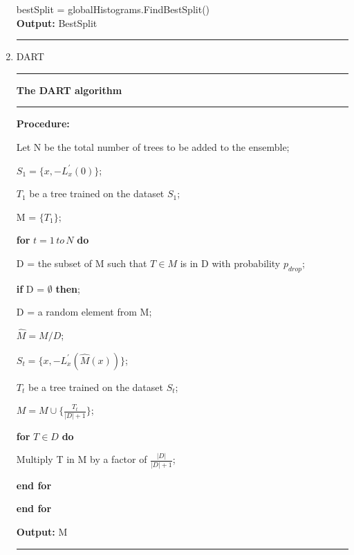 \documentclass[a4paper]{article}
\begin{document}
\begin{enumerate}
						\hspace*{32pt}	bestSplit = globalHistograms.FindBestSplit()\\
						\textbf{Output:} BestSplit\par
				\noindent\rule[0.10\baselineskip]{\textwidth}{0.75pt}\par
			\item DART\par
				\noindent\rule[0.10\baselineskip]{\textwidth}{0.5pt}\par
				\textbf{The DART algorithm}\\
				\noindent\rule[0.10\baselineskip]{\textwidth}{0.5pt}
						\textbf{Procedure:}\par
						\hspace*{32pt}	Let N be the total number of trees to be added to the ensemble;\par
						\hspace*{32pt}	$S_1 = \{x, -L_x^{'}(0)\}$;\par
						\hspace*{32pt}	$T_1$ be a tree trained on the dataset $S_1$;\par
						\hspace*{32pt}	M = $\{T_1\}$;\par
						\hspace*{32pt}  \textbf{for} $t = 1\,to\,N$ \textbf{do}\par
						\hspace*{48pt}	D = the subset of M such that $T\in M$ is in D with probability $p_{drop}$;\par
						\hspace*{48pt}  \textbf{if} D = $\emptyset$ \textbf{then};\par
						\hspace*{64pt}	D = a random element from M;\par
						\hspace*{48pt}	$\hat{M}  = M \slash D$;\par
						\hspace*{48pt}	$S_t = \{x, -L_x^{'}(\hat{M}(x))\}$;\par
						\hspace*{48pt}	$T_t$ be a tree trained on the dataset $S_t$;\par
						\hspace*{48pt}	$M = M \cup \{\frac{T_t}{|D|+1}\}$;\par
						\hspace*{48pt}	\textbf{for} $T\in D$ \textbf{do}\par
						\hspace*{64pt}	Multiply T in M by a factor of $\frac{|D|}{|D|+1}$;\par
						\hspace*{48pt}	\textbf{end for}\par
						\hspace*{32pt}	\textbf{end for}\par
						\textbf{Output:} M
				\noindent\rule[0.10\baselineskip]{\textwidth}{0.75pt}\par
		\end{enumerate}
\end{document}
